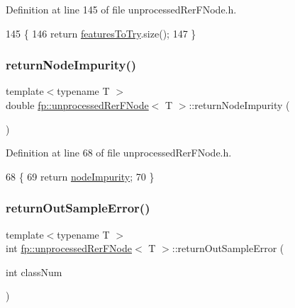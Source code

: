 Definition at line 145 of file unprocessed\+Rer\+F\+Node.\+h.


\begin{DoxyCode}
145                                                        \{
146                     \textcolor{keywordflow}{return} \hyperlink{classfp_1_1unprocessedRerFNode_aa2028578f341c8f41cf000eb40d228f2}{featuresToTry}.size();
147                 \}
\end{DoxyCode}
\mbox{\label{classfp_1_1unprocessedRerFNode_a05ccccf919dec2285a31de5e47145b76}} 
\subsubsection{\texorpdfstring{return\+Node\+Impurity()}{returnNodeImpurity()}}
{\footnotesize\ttfamily template$<$typename T $>$ \\
double \hyperlink{classfp_1_1unprocessedRerFNode}{fp\+::unprocessed\+Rer\+F\+Node}$<$ T $>$\+::return\+Node\+Impurity (\begin{DoxyParamCaption}{ }\end{DoxyParamCaption})\hspace{0.3cm}{\ttfamily [inline]}}



Definition at line 68 of file unprocessed\+Rer\+F\+Node.\+h.


\begin{DoxyCode}
68                                                   \{
69                     \textcolor{keywordflow}{return} \hyperlink{classfp_1_1unprocessedRerFNode_a5d7bc15c3a0717abefc4845aec168167}{nodeImpurity};
70                 \}
\end{DoxyCode}
\mbox{\label{classfp_1_1unprocessedRerFNode_af920a23a290c9552c246a2913be55761}} 
\subsubsection{\texorpdfstring{return\+Out\+Sample\+Error()}{returnOutSampleError()}}
{\footnotesize\ttfamily template$<$typename T $>$ \\
int \hyperlink{classfp_1_1unprocessedRerFNode}{fp\+::unprocessed\+Rer\+F\+Node}$<$ T $>$\+::return\+Out\+Sample\+Error (\begin{DoxyParamCaption}\item[{int}]{class\+Num }\end{DoxyParamCaption})\hspace{0.3cm}{\ttfamily [inline]}}



